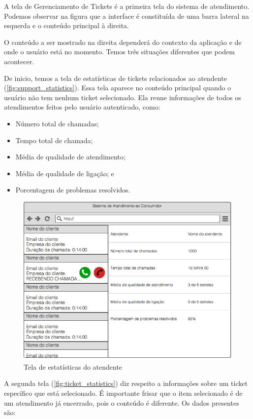 A tela de Gerenciamento de Tickets é a primeira tela do sistema de atendimento. Podemos observar na figura 
que a interface é constituída de uma barra lateral na esquerda e o conteúdo principal à direita. 

O conteúdo a ser mostrado na direita dependerá do contexto da aplicação e de onde o usuário está no momento. Temos três situações diferentes que podem acontecer.

De inicio, temos a tela de estatísticas de tickets relacionados ao atendente (\autoref{fig:support_statistics}). Essa tela aparece no conteúdo principal quando o usuário não tem nenhum ticket selecionado. Ela reune informações de todos os atendimentos feitos pelo usuário autenticado, como:

\begin{itemize}
  \item Número total de chamadas;
  \item Tempo total de chamada;
  \item Média de qualidade de atendimento;
  \item Média de qualidade de ligação; e
  \item Porcentagem de problemas resolvidos.
\end{itemize}

\begin{figure}[ht!]
	\centering
    \includegraphics[scale=0.4]{figures/support-statistics.png} 
	\caption{Tela de estatísticas do atendente}
	\label{fig:support_statistics}
\end{figure}

A segunda tela (\autoref{fig:ticket_statistics}) diz respeito a informações sobre um ticket específico que está selecionado. É importante frisar que o item selecionado é de um atendimento já encerrado, pois o conteúdo é diferente. 
Os dados presentes são:

